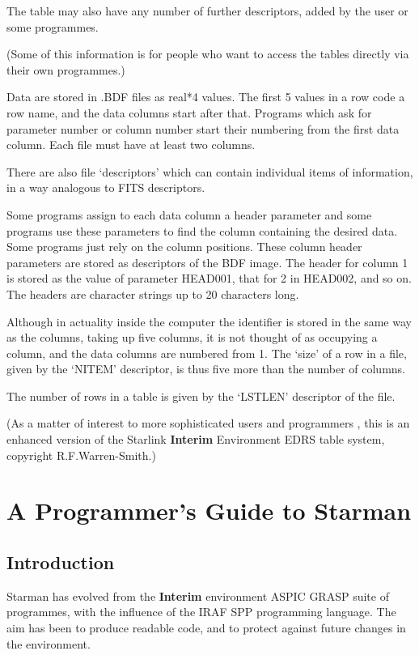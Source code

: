 The table may also have any number of further descriptors,
added by the user or some programmes.

(Some of this information is for people who want to access the tables
directly via their own programmes.)

Data are stored in .BDF files as real*4 values. The first 5 values 
in a row code a row name, and the data columns start after that. 
Programs which ask for parameter number or column number start 
their numbering from the first data column. Each file must have at 
least two columns.

There are also file `descriptors' which can contain individual items 
of information, in a way analogous to FITS descriptors.

Some programs assign to each data column a header parameter and some
programs use these parameters to find the column containing the 
desired data. Some programs just rely on the column positions. These 
column header parameters are stored as descriptors of the BDF image. 
The header for column 1 is stored as the value of parameter HEAD001, 
that for 2 in HEAD002, and so on. The headers are character strings 
up to 20 characters long. 

Although in actuality inside the computer the identifier is stored in 
the same way as the columns, taking up five columns, it is not 
thought of as occupying a column, and the data columns are numbered
from 1. The `size' of a row in a file, given by the `NITEM'
descriptor, is thus five more than the number of columns.

The number of rows in a table is given by the `LSTLEN' descriptor of 
the file.

(As a matter of interest to more sophisticated users and programmers ,
this is an enhanced version of the Starlink {\bf Interim} Environment 
EDRS table system, copyright R.F.Warren-Smith.)

\section { A Programmer's Guide to Starman}

\subsection{Introduction}

Starman has evolved from the {\bf Interim} environment ASPIC GRASP suite
of programmes, with the influence of the IRAF SPP programming language.
The aim has been to produce readable code, and to protect against
future changes in the environment.

